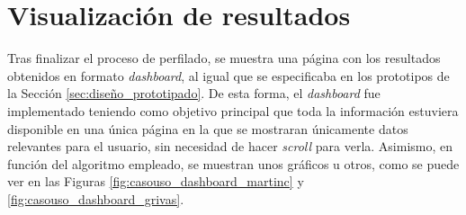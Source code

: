 \section{Visualización de resultados}
\label{sec:casouso_dashboard}

Tras finalizar el proceso de perfilado, se muestra una página con los resultados obtenidos en formato \textit{dashboard}, al igual
que se especificaba en los prototipos de la Sección \ref{sec:diseño_prototipado}. De esta forma, el \textit{dashboard} fue
implementado teniendo como objetivo principal que toda la información estuviera disponible en una única página en la que se
mostraran únicamente datos relevantes para el usuario, sin necesidad de hacer \textit{scroll} para verla. Asimismo, en función del algoritmo
empleado, se muestran unos gráficos u otros, como se puede ver en las Figuras \ref{fig:casouso_dashboard_martinc} y
\ref{fig:casouso_dashboard_grivas}.

